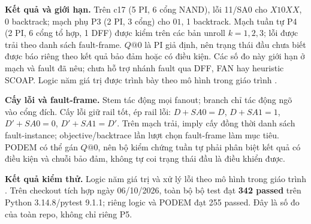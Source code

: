 \textbf{Kết quả và giới hạn.}
Trên c17 (5 PI, 6 cổng NAND), lỗi 11/SA0 cho $X10XX$, 0 backtrack;
mạch phụ P3 (2 PI, 3 cổng) cho $01$, 1 backtrack. Mạch tuần tự P4 (2 PI,
6 cổng tổ hợp, 1 DFF) được kiểm trên các bản unroll $k=1,2,3$; lỗi được
trải theo danh sách fault-frame. $Q@0$ là PI giả định, nên trạng thái đầu
chưa biết được báo riêng theo kết quả bảo đảm hoặc có điều kiện. Các số đo
này giới hạn ở mạch và fault đã nêu; chưa hỗ trợ nhánh fault qua DFF, FAN
hay heuristic SCOAP.
Logic năm giá trị được trình bày theo mô hình trong giáo trình
\cite[Ch.~3--4]{p5_wang2006}.

\textbf{Cấy lỗi và fault-frame.}
Stem tác động mọi fanout; branch chỉ tác động ngõ vào cổng đích.
Cấy lỗi giữ rail tốt, ép rail lỗi: $D+SA0=D$, $D+SA1=1$,
$D'+SA0=0$, $D'+SA1=D'$. Trên mạch trải, imply cấy đồng thời danh sách
fault-instance; objective/backtrace lần lượt chọn fault-frame làm mục tiêu.
PODEM có thể gán $Q@0$, nên bộ kiểm chứng tuần tự phải phân biệt kết quả
có điều kiện và chuỗi bảo đảm, không tự coi trạng thái đầu là điều khiển được.

\textbf{Kết quả kiểm thử.}
Logic năm giá trị và xử lý lỗi theo mô hình trong giáo trình
\cite[Ch.~3--4]{p5_wang2006}. Trên checkout tích hợp ngày 06/10/2026,
toàn bộ bộ test đạt \textbf{342 passed} trên Python 3.14.8/pytest 9.1.1;
riêng logic và PODEM đạt 255 passed. Đây là số đo của toàn repo, không
chỉ riêng P5.
